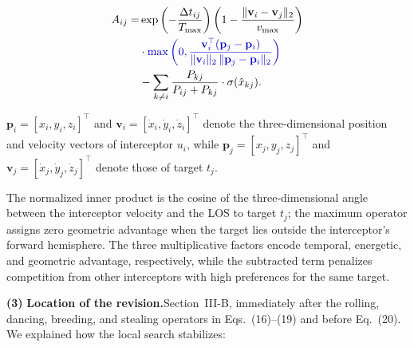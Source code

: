 \documentclass[11pt]{article}
\newcommand{\hladd}[1]{{\color{addblue}#1}}
\newcommand{\loc}{\medskip\noindent\textbf{Location of the revision.}\quad}
\begin{document}
\begin{tcolorbox}[enhanced,breakable,colback=white,colframe=addblue!55,
boxrule=0.6pt,arc=2pt,left=9pt,right=9pt,top=7pt,bottom=7pt]
\begin{equation*}
\begin{split}
A_{ij} =&
\exp\left(-\frac{\Delta t_{ij}}{T_{\max}}\right)
\left(1-\frac{\|\mathbf{v}_i-\mathbf{v}_j\|_2}{v_{\max}}\right) \\
&\cdot
\hladd{\max\left(0,
\frac{\mathbf{v}_i^{\top}(\mathbf{p}_j-\mathbf{p}_i)}
{\|\mathbf{v}_i\|_2\,\|\mathbf{p}_j-\mathbf{p}_i\|_2}\right)} \\
&-\sum_{k\neq i}\frac{P_{kj}}{P_{ij}+P_{kj}}
\cdot\sigma(\hat{x}_{kj}).
\end{split}
\end{equation*}

\hladd{$\mathbf{p}_i=[x_i,y_i,z_i]^\top$ and
$\mathbf{v}_i=[\dot{x}_i,\dot{y}_i,\dot{z}_i]^\top$ denote the
three-dimensional position and velocity vectors of interceptor $u_i$, while
$\mathbf{p}_j=[x_j,y_j,z_j]^\top$ and
$\mathbf{v}_j=[\dot{x}_j,\dot{y}_j,\dot{z}_j]^\top$ denote those of target
$t_j$.}

\medskip
\hladd{The normalized inner product is the cosine of the three-dimensional angle between the interceptor velocity and the LOS to target $t_j$; the maximum operator assigns zero geometric advantage when the target lies outside the interceptor's forward hemisphere.} The three multiplicative factors encode temporal, energetic, and geometric advantage, respectively, while the subtracted term penalizes competition from other interceptors with high preferences for the same target.
\end{tcolorbox}

\medskip
\noindent\textbf{(3)}
\loc Section~III-B, immediately after the rolling, dancing, breeding, and
stealing operators in Eqs.~(16)--(19) and before Eq.~(20).
We explained how the local search stabilizes:
\end{document}
